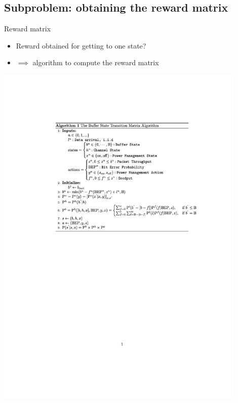 \documentclass{beamer}
\begin{document}
\subsection{Subproblem: obtaining the reward matrix}
\begin{frame}{Reward matrix}
\begin{itemize}
\item Reward obtained for getting to one state?
\item $\implies$ algorithm to compute the reward matrix
\end{itemize}
\end{frame}

\begin{frame}
\includegraphics[trim={2cm 10cm 0 2cm},width=12cm]{pseudocodes.jpg}
\end{frame}
\end{document}
